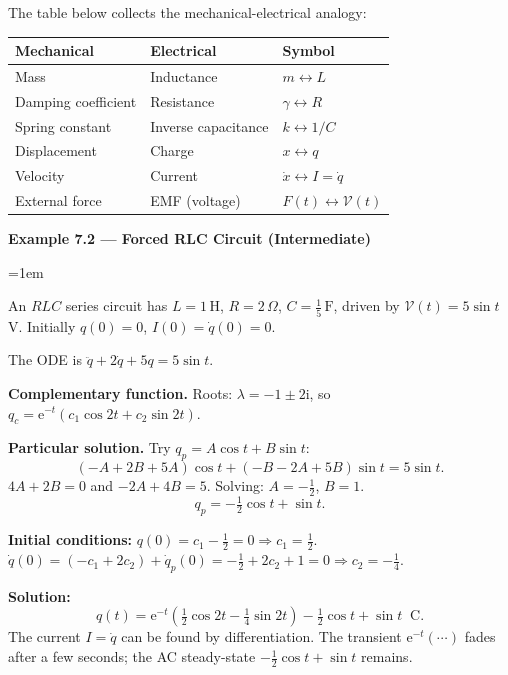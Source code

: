 \documentclass[12pt,a4paper]{article}
\newenvironment{example}[1]{%
  \vspace{0.8em}
  \noindent{\footnotesize\scshape\color{orange!50!black} Example}\par
  \noindent\textbf{#1}\par\vspace{0.3em}
  \begin{list}{}{\leftmargin=1em\rightmargin=0pt}\item
}{%
  \end{list}\vspace{0.8em}
}
\newcommand{\ee}{\mathrm{e}}
\newcommand{\ii}{\mathrm{i}}
\begin{document}
The table below collects the mechanical-electrical analogy:

\begin{center}
\renewcommand{\arraystretch}{1.3}
\begin{tabular}{lll}
\toprule
\rowcolor{midblue!14}
\textbf{Mechanical} & \textbf{Electrical} & \textbf{Symbol} \\
\midrule
\rowcolor{gray!6}
Mass & Inductance & $m \leftrightarrow L$ \\
Damping coefficient & Resistance & $\gamma \leftrightarrow R$ \\
\rowcolor{gray!6}
Spring constant & Inverse capacitance & $k \leftrightarrow 1/C$ \\
Displacement & Charge & $x \leftrightarrow q$ \\
\rowcolor{gray!6}
Velocity & Current & $\dot x \leftrightarrow I = \dot q$ \\
External force & EMF (voltage) & $F(t) \leftrightarrow \mathcal{V}(t)$ \\
\bottomrule
\end{tabular}
\end{center}

\begin{example}{Example 7.2 --- Forced RLC Circuit (Intermediate)}
An $RLC$ series circuit has $L=1\,\mathrm{H}$, $R=2\,\Omega$, $C=\tfrac{1}{5}\,\mathrm{F}$,
driven by $\mathcal{V}(t) = 5\sin t$ V. Initially $q(0)=0$, $I(0)=\dot q(0)=0$.

\medskip
The ODE is $\ddot q + 2\dot q + 5q = 5\sin t$.

\textbf{Complementary function.} Roots: $\lambda = -1\pm 2\ii$, so
$q_c = \ee^{-t}(c_1\cos 2t + c_2\sin 2t)$.

\textbf{Particular solution.} Try $q_p = A\cos t + B\sin t$:
\[
  (-A + 2B + 5A)\cos t + (-B - 2A + 5B)\sin t = 5\sin t.
\]
$4A + 2B = 0$ and $-2A + 4B = 5$. Solving: $A = -\tfrac{1}{2}$,
$B = 1$.
\[
  q_p = -\tfrac{1}{2}\cos t + \sin t.
\]

\textbf{Initial conditions:} $q(0) = c_1 - \tfrac{1}{2} = 0 \Rightarrow c_1 = \tfrac{1}{2}$.
$\dot q(0) = (-c_1 + 2c_2) + \dot q_p(0) = -\tfrac{1}{2} + 2c_2 + 1 = 0
\Rightarrow c_2 = -\tfrac{1}{4}$.

\textbf{Solution:}
\[
  \boxed{q(t) = \ee^{-t}\!\left(\tfrac{1}{2}\cos 2t - \tfrac{1}{4}\sin 2t\right)
                - \tfrac{1}{2}\cos t + \sin t\;\;\mathrm{C}.}
\]
The current $I = \dot q$ can be found by differentiation. The transient
$\ee^{-t}(\cdots)$ fades after a few seconds; the AC steady-state
$-\tfrac{1}{2}\cos t + \sin t$ remains.
\end{example}
\end{document}
